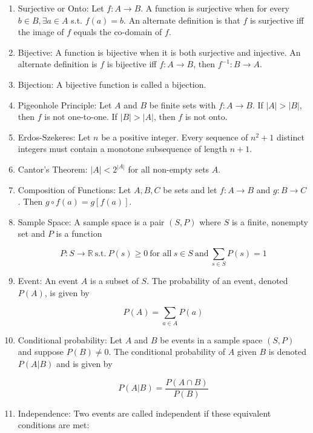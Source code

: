 \documentclass{article}
\begin{document}
\begin{enumerate}
		\item Surjective or Onto: Let $f:A\to B$.
		A function is surjective when for every $b\in B, \exists a\in A$ s.t. $f(a)=b$.
		An alternate definition is that $f$ is surjective iff the image of $f$ equals the co-domain of $f$.
		
		\item Bijective: A function is bijective when it is both surjective and injective.
		An alternate definition is $f$ is bijective iff $f:A\to B$, then $f^{-1}:B\to A$.
		
		\item Bijection: A bijective function is called a bijection.
		
		\item Pigeonhole Principle: Let $A$ and $B$ be finite sets with $f:A\to B$.
		If $|A|>|B|$, then $f$ is not one-to-one.
		If $|B|>|A|$, then $f$ is not onto.
		
		\item Erdos-Szekeres: Let $n$ be a positive integer.
		Every sequence of $n^2+1$ distinct integers must contain a monotone subsequence of length $n+1$.
		
		\item Cantor's Theorem: $|A|<2^{|A|}$ for all non-empty sets $A$.
		
		\item Composition of Functions: Let $A,B,C$ be sets and let $f:A\to B$ and $g:B\to C$.
		Then $g\circ f(a)=g[f(a)]$.
		
		\item Sample Space: A sample space is a pair $(S,P)$ where $S$ is a finite, nonempty set and $P$ is a function
		
		\[P:S\to\mathbb{R}\: \text{s.t.}\: P(s)\geq 0 \: \text{for all}\: s\in S \:\text{and}\: \sum_{s\in S}P(s)=1\]
		
		\item Event: An event $A$ is a subset of $S$.
		The probability of an event, denoted $P(A)$, is given by
		
		\[P(A)=\sum_{a\in A}P(a)\]
		
		\item Conditional probability: Let $A$ and $B$ be events in a sample space $(S,P)$ and suppose $P(B)\neq 0$.
		The conditional probability of $A$ given $B$ is denoted $P(A|B)$ and is given by
		
		\[P(A|B)=\frac{P(A\cap B)}{P(B)}\]
		
		\item Independence: Two events are called independent if these equivalent conditions are met:
		

\end{enumerate}
\end{document}
